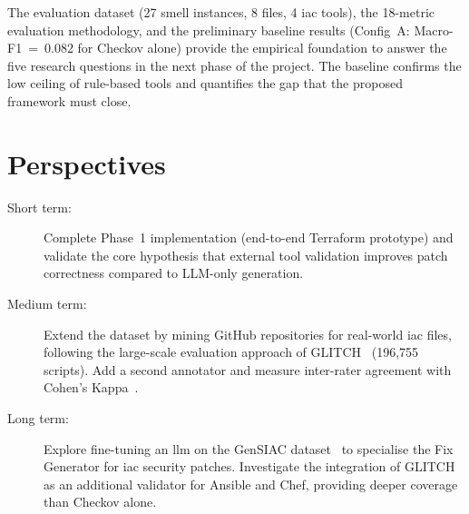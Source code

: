 \documentclass[12pt, a4paper]{report}
\begin{document}
The evaluation dataset (27 smell instances, 8 files, 4 \gls{iac} tools), the
18-metric evaluation methodology, and the preliminary baseline results
(Config~A: Macro-F1~=~0.082 for Checkov alone) provide the empirical foundation
to answer the five research questions in the next phase of the project.
The baseline confirms the low ceiling of rule-based tools and quantifies the
gap that the proposed framework must close.

\section{Perspectives}

\begin{description}
  \item[Short term:] Complete Phase~1 implementation (end-to-end Terraform prototype)
  and validate the core hypothesis that external tool validation improves patch
  correctness compared to LLM-only generation.

  \item[Medium term:] Extend the dataset by mining GitHub repositories for real-world
  \gls{iac} files, following the large-scale evaluation approach of
  GLITCH~\citep{saavedra2022glitch} (196,755 scripts). Add a second annotator
  and measure inter-rater agreement with Cohen's Kappa~\citep{cohen1960kappa}.

  \item[Long term:] Explore fine-tuning an \gls{llm} on the GenSIAC
  dataset~\citep{li2025gensiac} to specialise the Fix Generator for \gls{iac}
  security patches. Investigate the integration of GLITCH~\citep{saavedra2022glitch}
  as an additional validator for Ansible and Chef, providing deeper coverage
  than Checkov alone.
\end{description}


\end{document}
